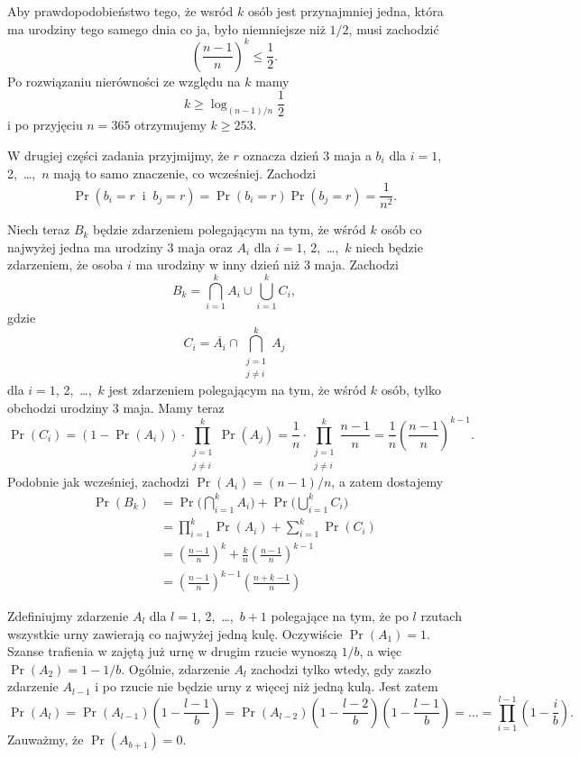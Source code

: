 Aby prawdopodobieństwo tego, że wsród $k$ osób jest przynajmniej jedna, która ma urodziny tego samego dnia co ja, było niemniejsze niż $1/2$, musi zachodzić
\[
	\left(\frac{n-1}{n}\right)^k \le \frac{1}{2}.
\]
Po rozwiązaniu nierówności ze względu na $k$ mamy
\[
	k \ge \log_{(n-1)/n}\frac{1}{2}
\]
i po przyjęciu $n=365$ otrzymujemy $k\ge253$.

W drugiej części zadania przyjmijmy, że $r$ oznacza dzień 3 maja a $b_i$ dla $i=1$, 2,~\dots,~$n$ mają to samo znaczenie, co wcześniej. Zachodzi
\[
	\Pr(b_i=r\;\;\text{i}\;\;b_j=r) = \Pr(b_i=r)\Pr(b_j=r) = \frac{1}{n^2}.
\]

Niech teraz $B_k$ będzie zdarzeniem polegającym na tym, że wśród $k$ osób co najwyżej jedna ma urodziny 3 maja oraz $A_i$ dla $i=1$, 2,~\dots,~$k$ niech będzie zdarzeniem, że osoba $i$ ma urodziny w inny dzień niż 3 maja. Zachodzi
\[
	B_k = \bigcap_{i=1}^kA_i\cup\bigcup_{i=1}^kC_i,
\]
gdzie
\[
	C_i = \overline{A_i}\cap\bigcap_{\substack{j=1\\j\ne i}}^kA_j
\]
dla $i=1$, 2,~\dots,~$k$ jest zdarzeniem polegającym na tym, że wśród $k$ osób, tylko  obchodzi urodziny 3 maja. Mamy teraz
\[
	\Pr(C_i) = (1-\Pr(A_i))\cdot\prod_{\substack{j=1\\j\ne i}}^k\Pr(A_j) = \frac{1}{n}\cdot\prod_{\substack{j=1\\j\ne i}}^k\frac{n-1}{n} = \frac{1}{n}\left(\frac{n-1}{n}\right)^{k-1}.
\]
Podobnie jak wcześniej, zachodzi $\Pr(A_i)=(n-1)/n$, a zatem dostajemy
\begin{align*}
	\Pr(B_k) &= \Pr\biggl(\bigcap_{i=1}^kA_i\biggr)+\Pr\biggl(\bigcup_{i=1}^kC_i\biggr) \\
	&= \prod_{i=1}^k\Pr(A_i)+\sum_{i=1}^k\Pr(C_i) \\
	&= \left(\frac{n-1}{n}\right)^k+\frac{k}{n}\left(\frac{n-1}{n}\right)^{k-1} \\
	&= \left(\frac{n-1}{n}\right)^{k-1}\left(\frac{n+k-1}{n}\right)
\end{align*}


\exercise{} %
Zdefiniujmy zdarzenie $A_l$ dla $l=1$, 2,~\dots,~$b+1$ polegające na tym, że po $l$ rzutach wszystkie urny zawierają co najwyżej jedną kulę. Oczywiście $\Pr(A_1)=1$. Szanse trafienia w zajętą już urnę w drugim rzucie wynoszą $1/b$, a więc $\Pr(A_2)=1-1/b$. Ogólnie, zdarzenie $A_l$ zachodzi tylko wtedy, gdy zaszło zdarzenie $A_{l-1}$ i po  rzucie nie będzie urny z więcej niż jedną kulą. Jest zatem
\[
	\Pr(A_l) = \Pr(A_{l-1})\left(1-\frac{l-1}{b}\right) = \Pr(A_{l-2})\left(1-\frac{l-2}{b}\right)\left(1-\frac{l-1}{b}\right) = \dots = \prod_{i=1}^{l-1}\left(1-\frac{i}{b}\right).
\]
Zauważmy, że $\Pr(A_{b+1})=0$.

